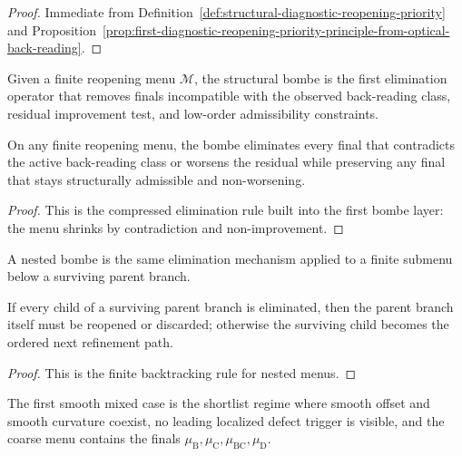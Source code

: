 \begin{proof}
Immediate from Definition~\ref{def:structural-diagnostic-reopening-priority} and Proposition~\ref{prop:first-diagnostic-reopening-priority-principle-from-optical-back-reading}.
\end{proof}

\begin{definition}
\label{def:structural-bombe-on-a-reopening-menu}
Given a finite reopening menu $\mathcal M$, the structural bombe is the first elimination operator that removes finals incompatible with the observed back-reading class, residual improvement test, and low-order admissibility constraints.
\end{definition}

\begin{proposition}
\label{prop:first-structural-bombe-elimination-principle-on-reopening-menus}
On any finite reopening menu, the bombe eliminates every final that contradicts the active back-reading class or worsens the residual while preserving any final that stays structurally admissible and non-worsening.
\end{proposition}

\begin{proof}
This is the compressed elimination rule built into the first bombe layer: the menu shrinks by contradiction and non-improvement.
\end{proof}

\begin{definition}
\label{def:nested-structural-bombe}
A nested bombe is the same elimination mechanism applied to a finite submenu below a surviving parent branch.
\end{definition}

\begin{proposition}
\label{prop:nested-bombe-backtracking-principle}
If every child of a surviving parent branch is eliminated, then the parent branch itself must be reopened or discarded; otherwise the surviving child becomes the ordered next refinement path.
\end{proposition}

\begin{proof}
This is the finite backtracking rule for nested menus.
\end{proof}

\begin{definition}
\label{def:first-smooth-mixed-shortlist-case}
The first smooth mixed case is the shortlist regime where smooth offset and smooth curvature coexist, no leading localized defect trigger is visible, and the coarse menu contains the finals $\mu_{\mathrm B},\mu_{\mathrm C},\mu_{\mathrm{BC}},\mu_{\mathrm D}$.
\end{definition}

